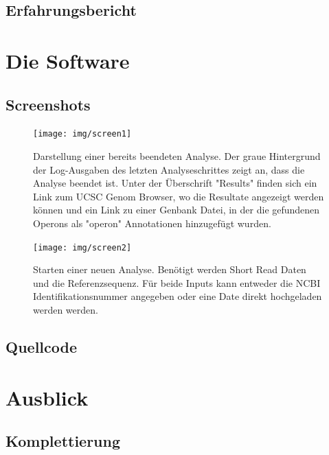 \documentclass[a4paper]{thesis}
\begin{document}
\subsection{Erfahrungsbericht}

\section{Die Software}

\subsection{Screenshots}

\begin{figure}[h]
\texttt{[image: img/screen1]}
\label{fig:screen1}
\caption[Screenshot 1]{
	Darstellung einer bereits beendeten Analyse. Der graue Hintergrund
	der Log-Ausgaben des letzten Analyseschrittes zeigt an, dass die
	Analyse beendet ist. Unter der Überschrift "Results" finden sich
	ein Link zum UCSC Genom Browser, wo die Resultate angezeigt werden
	können und ein Link zu einer Genbank Datei, in der die gefundenen
	Operons als "operon" Annotationen hinzugefügt wurden.
}

\end{figure}
\begin{figure}[h]
\texttt{[image: img/screen2]}
\label{fig:screen2}
\caption[Screenshot 2]{
	Starten einer neuen Analyse. Benötigt werden Short Read Daten und
	die Referenzsequenz. Für beide Inputs kann entweder die NCBI
	Identifikationsnummer angegeben oder eine Date direkt
	hochgeladen werden werden.
}
\end{figure}

\subsection{Quellcode}


\paragraphmark{}

\section{Ausblick}

\subsection{Komplettierung}
\end{document}
